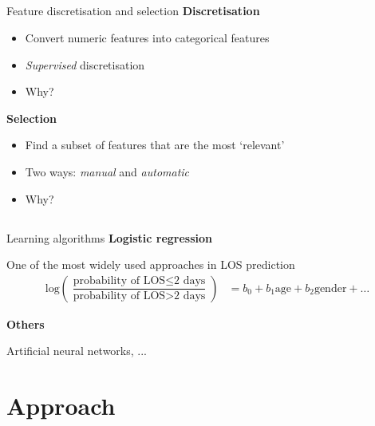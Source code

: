 \documentclass[compress]{beamer}
\begin{document}
\subsection{}
\begin{frame}{Feature discretisation and selection}
\textbf{Discretisation}
\begin{itemize}
\item Convert numeric features into categorical features
\item \textit{Supervised} discretisation
\item Why?
\end{itemize}

\vspace{0.5cm}

  \pause
\textbf{Selection}
\begin{itemize}
\item Find a subset of features that are the most `relevant'
\item Two ways: \textit{manual} and \textit{automatic}
\item Why?
\end{itemize}
\end{frame}

\subsection{}
\begin{frame}{Learning algorithms}
\textbf{Logistic regression}

One of the most widely used approaches in LOS prediction
\begin{equation*}
\begin{aligned}
\text{log}\left(\dfrac{\text{probability of LOS}\leq\text{2 days}}{\text{probability of LOS}>\text{2 days}}\right) &= b_0 + b_1\text{age} + b_2\text{gender} + \ldots
\end{aligned}
\end{equation*}
  \pause

\textbf{Others}

Artificial neural networks, ...
\end{frame}

\section{Approach}
\end{document}
